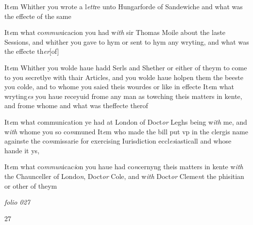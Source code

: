 \documentclass[12pt, a4paper]{book}
\begin{document}
				\marginpar[\vspace{0.5cm}{\textcolor{Gray}{n}}]{}
			
		\ifthenelse{\isodd{\thepage}}
		{\reversemarginpar}
		{\normalmarginpar}
		It\textit{e}m Whither you wrote a l\textit{ett}re unto Hungarforde of Sandewiche and what was the effecte of the same 
            	
 	
				\marginpar[\vspace{0.5cm}{\textcolor{Gray}{n}}]{}
			
		\ifthenelse{\isodd{\thepage}}
		{\reversemarginpar}
		{\normalmarginpar}
		It\textit{e}m what co\textit{mmun}icacion you had w\textit{ith} sir Thomas Moile about the laste Sessions, and whither you gave to hym or sent to hym any wryting, and what was the effecte th\textit{er}[of]
 	
		\ifthenelse{\isodd{\thepage}}
		{\reversemarginpar}
		{\normalmarginpar}
		It\textit{e}m Whither you wolde haue hadd Serls and Shether or either of theym to come to you secretlye with thair Articles, and you wolde haue holpen them the beeste you colde, and to whome you saied theis wourdes or like in effecte It\textit{e}m what wryting\textit{es} you haue receyuid frome any man as towching theis matters in kente, and frome whome and what was theffecte therof
 	
		\ifthenelse{\isodd{\thepage}}
		{\reversemarginpar}
		{\normalmarginpar}
		It\textit{e}m what communication ye had at London of Doct\textit{or} Leghs being w\textit{ith} me, and w\textit{ith} whome you so co\textit{m}muned It\textit{e}m who made the bill put vp in the clergis name againste the co\textit{m}missarie for exercising Iurisdiction eccl\textit{es}iasticall and whose hande it ys,
 	
		\ifthenelse{\isodd{\thepage}}
		{\reversemarginpar}
		{\normalmarginpar}
		It\textit{e}m what co\textit{mmun}icac\textit{i}on you haue had co\textit{n}cernyng theis matters in kente w\textit{ith} the Chaunceller of Londo\textit{n}, Doct\textit{or} Cole, and w\textit{ith} Doct\textit{or} Cleme\textit{n}t the phisitian or other of theym

\dotfill
					

\textit{folio 027}
         	\vspace{4cm}

\begin{flushright}{\color{Mahogany}27}\end{flushright}

\dotfill
					
\end{document}
